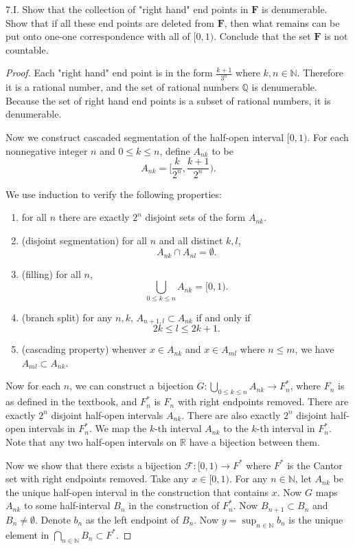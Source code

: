 7.I. Show that the collection of "right hand" end points in $\boldsymbol{F}$ is denumerable. Show that if all these end points are deleted from $\boldsymbol{F}$, then what remains can be put onto one-one correspondence with all of $[0,1)$. Conclude that the set $\boldsymbol{F}$ is not countable.
\begin{proof}
Each "right hand" end point is in the form $\frac{k+1}{3^n}$ where $k, n \in \mathbb{N}$. Therefore it is a rational number, and the set of rational numbers $\mathbb{Q}$ is denumerable. Because the set of right hand end points is a subset of rational numbers, it is denumerable.

Now we construct cascaded segmentation of the half-open interval $[0,1)$. For each nonnegative integer $n$ and $0\le k\le n$, define $A_{nk}$ to be \[
A_{nk} = [\frac{k}{2^n}, \frac{k+1}{2^n}) 
.\] 

We use induction to verify the following properties:
\begin{enumerate}
	\item for all $n$ there are exactly $2^n$ disjoint sets of the form $A_{nk }$.
	\item (disjoint segmentation) for all $n$ and all distinct  $k, l$, 
		\[
		A_{nk}\cap A_{nl} = \emptyset 
		.\] 
	\item (filling) for all $n$, \[
\bigcup_{0\le k\le n} A_{nk} = [0,1)
.\] 

\item (branch split) for any $n, k$, $A_{n+1, l} \subset A_{nk}$ if and only if \[
2k \le l \le 2k+1
.\] 
\item (cascading property) whenver $x \in A_{nk}$ and $x \in A_{ml}$ where $n \le  m$, we have $A_{ml} \subset  A_{nk}$.
\end{enumerate}

Now for each $n$, we can construct a bijection $G:\bigcup_{0\le k\le n} A_{nk} \to F_n^*$, where $F_n$ is as defined in the textbook, and $F_n^*$ is  $F_n$ with right endpoints removed. 
There are exactly $2^n$ disjoint half-open intervals $A_{nk }$. There are also exactly $2^n$ disjoint half-open intervals in $F_n^*$. We map the $k$-th interval $A_{nk }$ to the $k$-th interval in $F_n^*$. Note that any two half-open intervals on $\mathbb{R}$ have a bijection between them.

Now we show that there exists a bijection $\mathcal{F}:[0,1) \to F^*$ where $F^*$ is the Cantor set with right endpoints removed. Take any $x \in [0,1)$. For any $n \in \mathbb{N}$, let $A_{nk}$ be the unique half-open interval in the construction that contains $x$. Now $G$ maps $A_{nk }$ to some half-interval $B_n$ in the construction of $F_n^*$. 
Now $B_{n+1}\subset B_n$ and  $B_n \neq \emptyset $. Denote $b_n$ as the left endpoint of $B_n$. Now $y = \operatorname{sup}_{n \in \mathbb{N}} b_n $ is the unique element in $\bigcap_{n \in \mathbb{N}} B_n \subset F^*$.



\end{proof}
